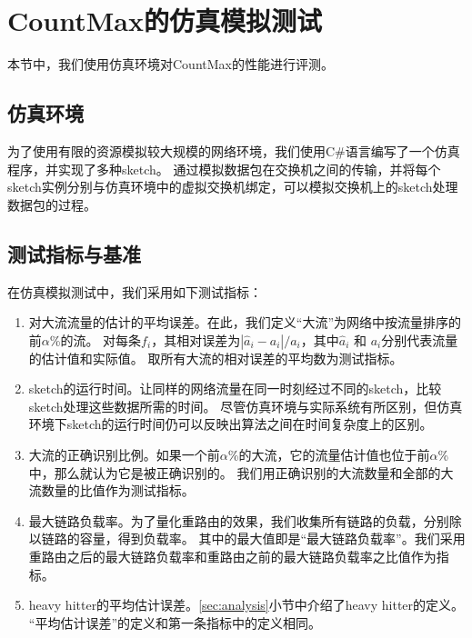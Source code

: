 \section{CountMax的仿真模拟测试}\label{sec:simulation}
本节中，我们使用仿真环境对CountMax的性能进行评测。

\subsection{仿真环境}
为了使用有限的资源模拟较大规模的网络环境，我们使用C\#语言编写了一个仿真程序，并实现了多种sketch。
通过模拟数据包在交换机之间的传输，并将每个sketch实例分别与仿真环境中的虚拟交换机绑定，可以模拟交换机上的sketch处理数据包的过程。


\subsection{测试指标与基准}\label{subsec:metric}
在仿真模拟测试中，我们采用如下测试指标：
\begin{enumerate}
	\item
    对大流流量的估计的平均误差。在此，我们定义“大流”为网络中按流量排序的前$\alpha$\%的流。
    对每条$f_i$，其相对误差为$|\hat{a}_i-a_i|/a_i$，其中$\hat{a}_i$ 和 $a_i$分别代表流量的估计值和实际值。
    取所有大流的相对误差的平均数为测试指标。
	\item
	sketch的运行时间。让同样的网络流量在同一时刻经过不同的sketch，比较sketch处理这些数据所需的时间。
	尽管仿真环境与实际系统有所区别，但仿真环境下sketch的运行时间仍可以反映出算法之间在时间复杂度上的区别。
	\item
	大流的正确识别比例。如果一个前$\alpha$\%的大流，它的流量估计值也位于前$\alpha$\%中，那么就认为它是被正确识别的。
	我们用正确识别的大流数量和全部的大流数量的比值作为测试指标。
	\item
	最大链路负载率。为了量化重路由的效果，我们收集所有链路的负载，分别除以链路的容量，得到负载率。
	其中的最大值即是“最大链路负载率”。我们采用重路由之后的最大链路负载率和重路由之前的最大链路负载率之比值作为指标。
	\item
	heavy hitter的平均估计误差。\ref{sec:analysis}小节中介绍了heavy hitter的定义。
	“平均估计误差”的定义和第一条指标中的定义相同。
\end{enumerate}

